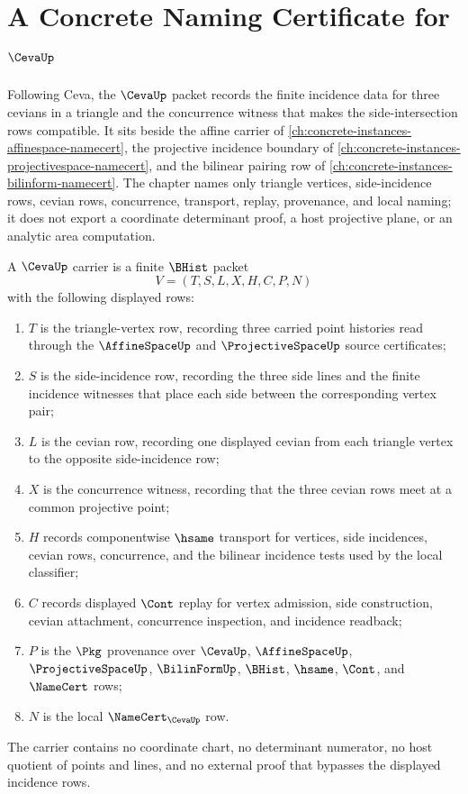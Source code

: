\chapter{A Concrete Naming Certificate for $\CevaUp$}
\label{ch:concrete-instances-ceva-namecert}

Following Ceva, the $\CevaUp$ packet records the finite incidence data for three cevians in a triangle and the concurrence witness that makes the side-intersection rows compatible. It sits beside the affine carrier of \autoref{ch:concrete-instances-affinespace-namecert}, the projective incidence boundary of \autoref{ch:concrete-instances-projectivespace-namecert}, and the bilinear pairing row of \autoref{ch:concrete-instances-bilinform-namecert}. The chapter names only triangle vertices, side-incidence rows, cevian rows, concurrence, transport, replay, provenance, and local naming; it does not export a coordinate determinant proof, a host projective plane, or an analytic area computation.

\begin{definition}
\label{def:ceva-carrier}
A $\CevaUp$ carrier is a finite $\BHist$ packet
$$
V=(T,S,L,X,H,C,P,N)
$$
with the following displayed rows:
\begin{enumerate}
\item $T$ is the triangle-vertex row, recording three carried point histories read through the $\AffineSpaceUp$ and $\ProjectiveSpaceUp$ source certificates;
\item $S$ is the side-incidence row, recording the three side lines and the finite incidence witnesses that place each side between the corresponding vertex pair;
\item $L$ is the cevian row, recording one displayed cevian from each triangle vertex to the opposite side-incidence row;
\item $X$ is the concurrence witness, recording that the three cevian rows meet at a common projective point;
\item $H$ records componentwise $\hsame$ transport for vertices, side incidences, cevian rows, concurrence, and the bilinear incidence tests used by the local classifier;
\item $C$ records displayed $\Cont$ replay for vertex admission, side construction, cevian attachment, concurrence inspection, and incidence readback;
\item $P$ is the $\Pkg$ provenance over $\CevaUp$, $\AffineSpaceUp$, $\ProjectiveSpaceUp$, $\BilinFormUp$, $\BHist$, $\hsame$, $\Cont$, and $\NameCert$ rows;
\item $N$ is the local $\NameCert_{\CevaUp}$ row.
\end{enumerate}
The carrier contains no coordinate chart, no determinant numerator, no host quotient of points and lines, and no external proof that bypasses the displayed incidence rows.
\end{definition}


